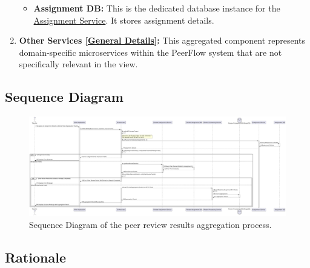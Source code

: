 \begin{enumerate}
\begin{itemize}
        \item \textbf{Assignment DB:} This is the dedicated database instance for the \hyperref[def:AssignmentService]{Assignment Service}. It stores assignment details.
    \end{itemize}
    
    \item \textbf{Other Services \hyperref[def:GenDetailsOtherServices]{[General Details]}:} This aggregated component represents domain-specific microservices within the PeerFlow system that are not specifically relevant in the view.
\end{enumerate}

\subsection{Sequence Diagram}

\begin{figure}[h]
    \centering
    \includegraphics[width=0.9\linewidth]{Architettura/imgs/pr_proc_seq.pdf}
    \caption{Sequence Diagram of the peer review results aggregation process.}
    \label{fig:seqPeerReviewResultsAggregation}
\end{figure}

\subsection{Rationale}

